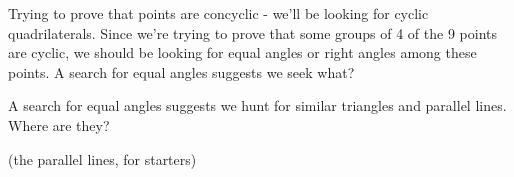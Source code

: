 Trying to prove that points are concyclic - we'll be looking for cyclic quadrilaterals. Since we're trying to prove that some groups of 4 of the 9 points are cyclic, we should be looking for equal angles or right angles among these points. A search for equal angles suggests we seek what?








A search for equal angles suggests we hunt for similar triangles and parallel lines. Where are they?

(the parallel lines, for starters)









